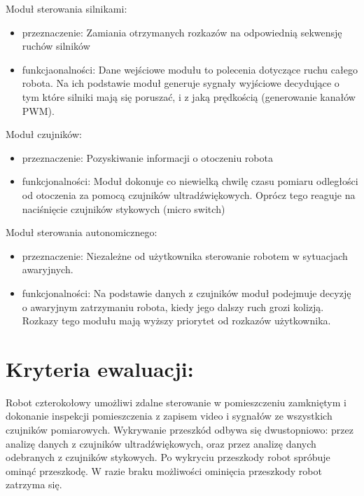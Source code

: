 \documentclass[a4paper]{article}
\begin{document}
Moduł sterowania silnikami:
\begin{itemize}
\item przeznaczenie: Zamiania otrzymanych rozkazów na odpowiednią sekwensję ruchów silników
\item funkcjaonalności: Dane wejściowe modułu to polecenia dotyczące ruchu całego robota. Na ich podstawie moduł generuje sygnały wyjściowe decydujące o tym które silniki mają się poruszać, i z jaką prędkością (generowanie kanałów PWM). 
\end{itemize}
\newpage
Moduł czujników:
\begin{itemize}
\item przeznaczenie: Pozyskiwanie informacji o otoczeniu robota
\item funkcjonalności: Moduł dokonuje co niewielką chwilę czasu pomiaru odległości od otoczenia za pomocą czujników ultradźwiękowych. Oprócz tego reaguje na naciśnięcie czujników stykowych (micro switch)
\end{itemize}

Moduł sterowania autonomicznego:
\begin{itemize}
\item przeznaczenie: Niezależne od użytkownika sterowanie robotem w sytuacjach awaryjnych. 
\item funkcjonalności: Na podstawie danych z czujników moduł podejmuje decyzję o awaryjnym zatrzymaniu robota, kiedy jego dalszy ruch grozi kolizją. Rozkazy tego modułu mają wyższy priorytet od rozkazów użytkownika. 
\end{itemize}


\section{ Kryteria ewaluacji:}

Robot czterokołowy umożliwi zdalne sterowanie w pomieszczeniu zamkniętym i dokonanie inspekcji pomieszczenia z zapisem video i sygnałów ze wszystkich czujników pomiarowych. Wykrywanie przeszkód odbywa się dwustopniowo: przez analizę danych z czujników ultradźwiękowych, oraz przez analizę danych odebranych z czujników stykowych. Po wykryciu przeszkody robot spróbuje ominąć przeszkodę. W razie braku możliwości ominięcia przeszkody robot zatrzyma się.
\end{document}

